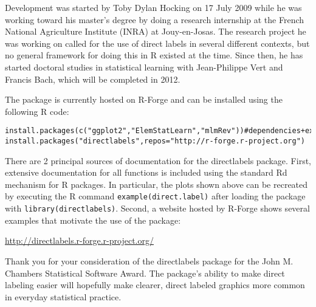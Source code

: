 \documentclass[12pt]{article}
\begin{document}
Development was started by Toby Dylan Hocking on 17 July 2009 while he
was working toward his master's degree by doing a research internship
at the French National Agriculture Institute (INRA) at
Jouy-en-Josas. The research project he was working on called for the
use of direct labels in several different contexts, but no general
framework for doing this in R existed at the time. Since then, he has
started doctoral studies in statistical learning with Jean-Philippe
Vert and Francis Bach, which will be completed in 2012.

The package is currently hosted on R-Forge and can be installed
using the following R code:

\begin{verbatim}
install.packages(c("ggplot2","ElemStatLearn","mlmRev"))#dependencies+examples
install.packages("directlabels",repos="http://r-forge.r-project.org")
\end{verbatim}

There are 2 principal sources of documentation for the directlabels
package. First, extensive documentation for all functions is included
using the standard Rd mechanism for R packages. In particular, the
plots shown above can be recreated by executing the R command
\texttt{example(direct.label)} after loading the package with
\texttt{library(directlabels)}. Second, a website hosted by R-Forge
shows several examples that motivate the use of the package:

\url{http://directlabels.r-forge.r-project.org/}

Thank you for your consideration of the directlabels package for the
John M. Chambers Statistical Software Award. The package's ability to
make direct labeling easier will hopefully make clearer, direct
labeled graphics more common in everyday statistical practice.
\end{document}

